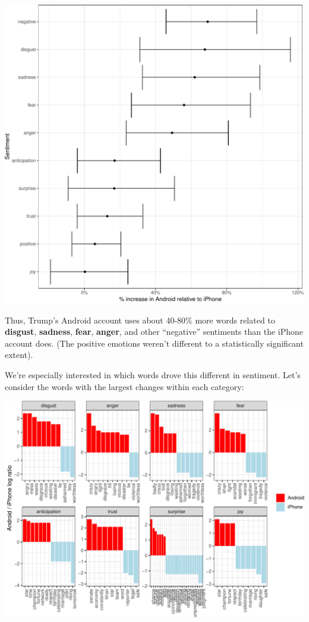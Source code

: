 \documentclass[
]{article}
\begin{document}
\includegraphics{Live_Demo_files/figure-latex/unnamed-chunk-7-1.pdf}

Thus, Trump's Android account uses about 40-80\% more words related to
\textbf{disgust}, \textbf{sadness}, \textbf{fear}, \textbf{anger}, and
other ``negative'' sentiments than the iPhone account does. (The
positive emotions weren't different to a statistically significant
extent).

We're especially interested in which words drove this different in
sentiment. Let's consider the words with the largest changes within each
category:

\includegraphics{Live_Demo_files/figure-latex/unnamed-chunk-8-1.pdf}
\end{document}
